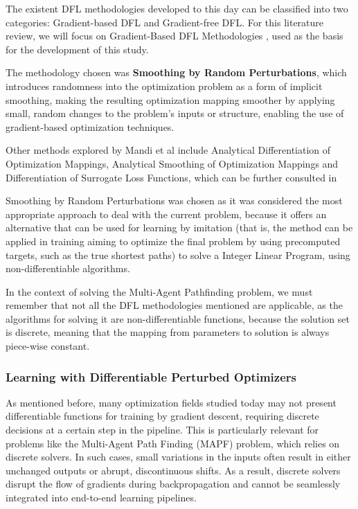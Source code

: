 The existent DFL methodologies developed to this day can be classified into two categories: Gradient-based DFL and Gradient-free DFL. For this literature review, we will focus on Gradient-Based DFL Methodologies \cite{mandiDecisionFocusedLearningFoundations2024}, used as the basis for the development of this study. 

The methodology chosen was \textbf{Smoothing by Random Perturbations}, which introduces randomness into the optimization problem as a form of implicit smoothing, making the resulting optimization mapping smoother by applying small, random changes to the problem's inputs or structure, enabling the use of gradient-based optimization techniques. 

Other methods explored by Mandi et al include Analytical Differentiation of Optimization Mappings, Analytical Smoothing of Optimization Mappings and Differentiation of Surrogate Loss Functions, which can be further consulted in \cite{mandiDecisionFocusedLearningFoundations2024}

Smoothing by Random Perturbations was chosen as it was considered the most appropriate approach to deal with the current problem, because it offers an alternative that can be used for learning by imitation (that is, the method can be applied in training aiming to optimize the final problem by using precomputed targets, such as the true shortest paths) to solve a Integer Linear Program, using non-differentiable algorithms.

In the context of solving the Multi-Agent Pathfinding problem, we must remember that not all the DFL methodologies mentioned are applicable, as the algorithms for solving it are non-differentiable functions, because the solution set is discrete, meaning that the mapping from parameters to solution is always piece-wise constant.

\subsubsection{Learning with Differentiable Perturbed Optimizers}

As mentioned before, many optimization fields studied today may not present differentiable functions for training by gradient descent, requiring discrete decisions at a certain step in the pipeline. This is particularly relevant for problems like the Multi-Agent Path Finding (MAPF) problem, which relies on discrete solvers. In such cases, small variations in the inputs often result in either unchanged outputs or abrupt, discontinuous shifts. As a result, discrete solvers disrupt the flow of gradients during backpropagation and cannot be seamlessly integrated into end-to-end learning pipelines.


